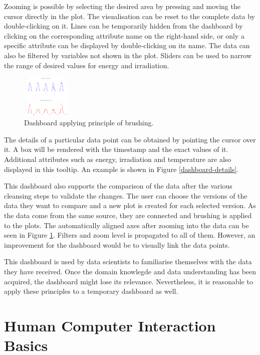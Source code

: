 \documentclass[11pt]{article}
\begin{document}
Zooming is possible by selecting the desired area by pressing and moving the cursor directly in the plot. The visualisation can be reset to the complete data by double-clicking on it. Lines can be temporarily hidden from the dashboard by clicking on the corresponding attribute name on the right-hand side, or only a specific attribute can be displayed by double-clicking on its name. The data can also be filtered by variables not shown in the plot. Sliders can be used to narrow the range of desired values for energy and irradiation. 

\begin{figure}
    \includegraphics[width=0.2\textwidth]{./dashboard-brushing.png}
    \caption{Dashboard applying principle of brushing.}
    \label{dashboard-brushing}
\end{figure}

The details of a particular data point can be obtained by pointing the cursor over it. A box will be rendered with the timestamp and the exact values of it. Additional attributes such as energy, irradiation and temperature are also displayed in this tooltip. An example is shown in Figure \ref{dashboard-details}.

This dashboard also supports the comparison of the data after the various cleansing steps to validate the changes. The user can choose the versions of the data they want to compare and a new plot is created for each selected version. As the data come from the same source, they are connected and brushing is applied to the plots. The automatically aligned axes after zooming into the data can be seen in Figure \ref{dashboard-brushing}. Filters and zoom level is propagated to all of them. However, an improvement for the dashboard would be to visually link the data points. 

This dashboard is used by data scientists to familiarise themselves with the data they have received. Once the domain knowlegde and data understanding has been acquired, the dashboard might lose its relevance. Nevertheless, it is reasonable to apply these principles to a temporary dashboard as well.

\pagebreak
\section{Human Computer Interaction Basics}
\end{document}
